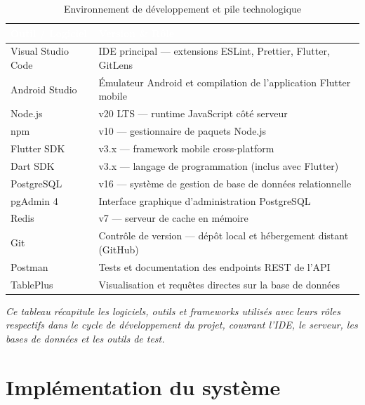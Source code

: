 \begin{table}[!htbp]
    \centering
    \renewcommand{\arraystretch}{1.4}
    \begin{tabular}{|l|p{10.5cm}|}
        \hline
        \rowcolor{darkblue}\textcolor{white}{\textbf{Outil / Logiciel}} & \textcolor{white}{\textbf{Version \& Rôle}} \\
        \hline
        Visual Studio Code & IDE principal --- extensions ESLint, Prettier, Flutter, GitLens \\
        \hline
        Android Studio & Émulateur Android et compilation de l'application Flutter mobile \\
        \hline
        Node.js & v20 LTS --- runtime JavaScript côté serveur \\
        \hline
        npm\cite{npm} & v10 --- gestionnaire de paquets Node.js \\
        \hline
        Flutter SDK & v3.x --- framework mobile cross-platform \\
        \hline
        Dart SDK & v3.x --- langage de programmation (inclus avec Flutter) \\
        \hline
        PostgreSQL & v16 --- système de gestion de base de données relationnelle \\
        \hline
        pgAdmin 4 & Interface graphique d'administration PostgreSQL \\
        \hline
        Redis & v7 --- serveur de cache en mémoire \\
        \hline
        Git & Contrôle de version --- dépôt local et hébergement distant (GitHub) \\
        \hline
        Postman & Tests et documentation des endpoints REST de l'API \\
        \hline
        TablePlus & Visualisation et requêtes directes sur la base de données \\
        \hline
    \end{tabular}
    \caption{Environnement de développement et pile technologique}
    \label{tab:env_dev}
\end{table}

\vspace{0.2cm}
\noindent\small\textit{Ce tableau récapitule les logiciels, outils et frameworks utilisés avec leurs rôles respectifs dans le cycle de développement du projet, couvrant l'IDE, le serveur, les bases de données et les outils de test.}\normalsize

\section{Implémentation du système}

